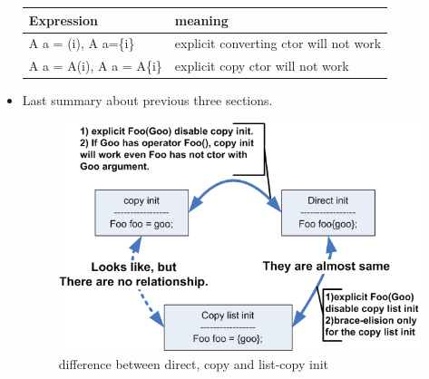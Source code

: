 \documentclass[a4paper,11pt,twoside]{book}
\newcommand{\tophline}{\hline }
\newcommand{\bottomhline}{\\ \hline }
\newcommand{\tophline}{ }
\newcommand{\bottomhline}{ }
\begin{document}
\begin{itemize}
\begin{tabular}{|p{}|p{}|}
	\tophline
	Expression & meaning \\
	\tophline
	A a = (i), A a=\{i\} & explicit converting ctor will not work \\
	\tophline
	A a = A(i), A a = A\{i\} & explicit copy ctor will not work 
	\bottomhline
\end{tabular}

\item Last summary about previous three sections.
\begin{figure}[h]
	\centering
	\includegraphics[width=0.9\linewidth]{pics/copy_list.png}
	\caption{difference between direct, copy and list-copy init}
	\label{fig:copylist}
\end{figure}


\end{itemize}
\end{document}
